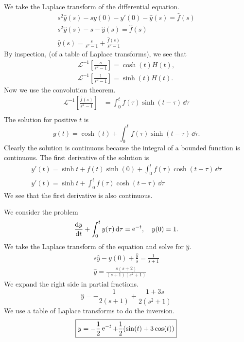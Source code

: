 {\begin{Solution}
  We take the Laplace transform of the differential equation.
  \begin{gather*}
    s^2 \hat{y}(s) - s y(0) - y'(0) - \hat{y}(s) = \hat{f}(s) \\
    s^2 \hat{y}(s) - s - \hat{y}(s) = \hat{f}(s) \\
    \hat{y}(s) = \frac{s}{s^2 - 1} + \frac{ \hat{f}(s) }{s^2 - 1}
  \end{gather*}
  By inspection, (of a table of Laplace transforms), we see that
  \begin{gather*}
    \mathcal{L}^{-1} \left[ \frac{s}{s^2 - 1} \right] = \cosh(t) H(t), \\
    \mathcal{L}^{-1} \left[ \frac{1}{s^2 - 1} \right] = \sinh(t) H(t).
  \end{gather*}
  Now we use the convolution theorem.
  \begin{align*}
    \mathcal{L}^{-1} \left[ \frac{ \hat{f}(s) }{ s^2  - 1 } \right]
    &= \int_0^t f(\tau) \sinh(t - \tau) \,\dd \tau \\
  \end{align*}
  The solution for positive $t$ is
  \[
  \boxed{
    y(t) = \cosh(t) + \int_0^t f(\tau) \sinh(t - \tau) \,\dd \tau. 
    }
  \]
  Clearly the solution is continuous because the integral of a bounded function
  is continuous.  The first derivative of the solution is
  \begin{gather*}
    y'(t) = \sinh t + f(t) \sinh(0) + \int_0^t f(\tau) \cosh(t - \tau) \,\dd \tau \\
    y'(t) = \sinh t + \int_0^t f(\tau) \cosh(t - \tau) \,\dd \tau 
  \end{gather*}
  We see that the first derivative is also continuous.
\end{Solution}











\begin{Solution}
  \label{solution y' + int y = e-t}
  We consider the problem
  \[
  \frac{\mathrm{d} y}{\mathrm{d} t} + \int_0^t y(\tau) \,\mathrm{d} \tau = \mathop{\mathrm{e}}\nolimits^{-t},\quad y(0) = 1.
  \]
  We take the Laplace transform of the equation and solve for $\hat{y}$.
  \begin{gather*}
    s \hat{y} - y(0) + \frac{\hat{y}}{s} = \frac{1}{s + 1} \\
    \hat{y} = \frac{ s (s + 2) }{ (s + 1)(s^2 + 1) }
  \end{gather*}
  We expand the right side in partial fractions.
  \[
  \hat{y} = - \frac{1}{2(s + 1)} + \frac{1 + 3 s}{2 (s^2 + 1)}
  \]
  We use a table of Laplace transforms to do the inversion.
  \[
  \boxed{
    y = - \frac{1}{2} \mathop{\mathrm{e}}\nolimits^{-t} + \frac{1}{2} ( \sin(t) + 3 \cos(t) )
    }
  \]
\end{Solution}






}
